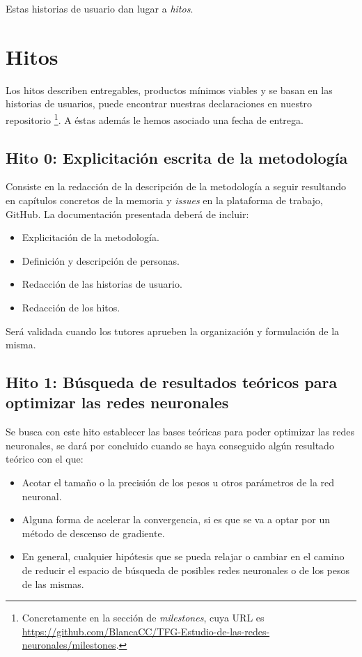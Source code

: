 
Estas historias de usuario dan lugar a \textit{hitos}. 

\section{Hitos} \label{ch00:hitos} 

Los hitos describen entregables, productos mínimos viables y se basan en las historias de usuarios,
puede encontrar nuestras declaraciones en nuestro repositorio \footnote{Concretamente en la sección de \textit{milestones}, cuya URL es \url{https://github.com/BlancaCC/TFG-Estudio-de-las-redes-neuronales/milestones}.}. 
A éstas además le hemos asociado una fecha de entrega. 


\subsection*{Hito 0: Explicitación escrita de la metodología} 
Consiste en la redacción de la descripción de la metodología a seguir resultando en capítulos concretos de la memoria 
y \textit{issues} en la plataforma de trabajo, GitHub.  
La documentación presentada deberá de incluir: 
\begin{itemize}
    \item Explicitación de la metodología. 
    \item Definición y descripción de personas.
    \item Redacción de las historias de usuario.
    \item Redacción de los hitos.
\end{itemize}
Será validada cuando los tutores aprueben la organización y formulación de la misma.


\subsection*{Hito 1: Búsqueda de resultados teóricos para optimizar  las redes neuronales}

Se busca con este hito establecer las bases teóricas para poder optimizar las redes neuronales, se dará por concluido cuando se haya conseguido algún resultado teórico con el que:
\begin{itemize}
    \item Acotar el tamaño o la precisión de los pesos u otros parámetros de la red neuronal.
    \item Alguna forma de acelerar la convergencia, si es que se va a optar por un método de descenso de gradiente.
    \item En general, cualquier hipótesis que se pueda relajar o cambiar en el camino de reducir el espacio de búsqueda de posibles redes neuronales o de los pesos de las mismas.
\end{itemize}

